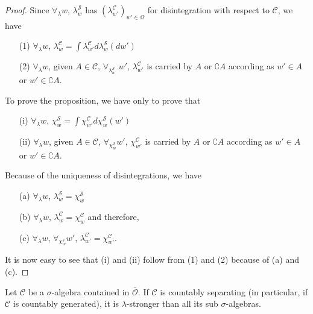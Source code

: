 \begin{proof}
Since $\forall_\lambda w$, $\lambda^\mathscr{S}_w$ has
$(\lambda^\mathscr{C}_{w'})_{w' \in \Omega}$ for disintegration with
respect to $\mathscr{C}$, we have
\begin{itemize}
\item[{\rm (1)}] $\forall_\lambda w$, $\lambda^\mathscr{C}_w = \int
  \lambda^\mathscr{C}_{w'} d \lambda^\mathscr{S}_w(dw')$ 

\item[{\rm (2)}] $\forall_\lambda w$, given $A \in\mathscr{C}$,
  $\forall_{\lambda^\mathscr{S}_w}$ $w'$, $\lambda^\mathscr{C}_{w'}$
  is carried by $A$ or $\complement A$ according as $w' \in A$ or $w'
  \in\complement A$.
\end{itemize}

To prove the proposition, we have only to prove that 
\begin{itemize}
\item[{\rm (i)}] $\forall_\lambda w$, $\chi^\mathscr{S}_w = \int
  \chi^\mathscr{C}_{w'} d \chi^\mathscr{S}_w(w') $

\item[{\rm (ii)}] $\forall_\lambda w$, given $A \in \mathscr{C}$,
  $\forall_{\chi^\mathscr{S}_w} w'$, $\chi^\mathscr{C}_{w'}$ is
  carried by $A$ or $\complement A$ according as $w' \in A$ or $w' \in
  \complement A$. 
\end{itemize}

Because of the uniqueness of disintegrations, we have
\begin{itemize}
\item[{\rm (a)}] $\forall_\lambda w$, $\lambda^\mathscr{S}_w = \chi^\mathscr{S}_w$

\item[{\rm (b)}] $\forall_\lambda w$, $\lambda^\mathscr{C}_w =
  \chi^\mathscr{C}_w$ and therefore,

\item[{\rm (c)}] $\forall_\lambda w$, $\forall_{\chi^s_w} w'$,
  $\lambda^\mathscr{C}_{w'} = \chi^\mathscr{C}_{w'}$. 
\end{itemize}

It is now easy to see that (i) and (ii) follow from (1) and (2)
because of (a) and (c).

\end{proof}

\begin{proposition}\label{part2:chap7:prop99}
Let $\mathscr{C}$ be a $\sigma$-algebra contained in
$\bar{\mathscr{O}}$. If $\mathscr{C}$ is countably separating (in
particular, if $\mathscr{C}$  is countably generated), it is
$\lambda$-stronger than all its sub $\sigma$-algebras.
\end{proposition}

